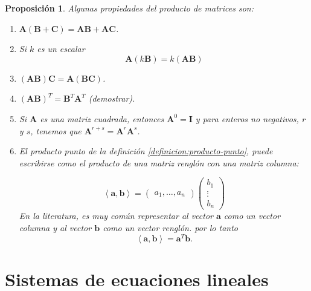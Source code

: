 \documentclass[11pt]{report}
\theoremstyle{break}
\newtheorem{proposicion}{Proposición}[chapter]
\theoremstyle{break}
\begin{document}
\begin{proposicion}
\label{proposicion:producto-matrices}
Algunas propiedades del producto de matrices son:
\begin{enumerate}[label=\alph*)]
\item $\bm{A} (\bm{B} + \bm{C}) = \bm{A}\bm{B} + \bm{A}\bm{C}$.
\item Si $k$ es un escalar 
$$\bm{A}(k\bm{B}) = k(\bm{AB})$$
\item $(\bm{AB})\bm{C} = \bm{A}(\bm{BC})$.
\item $(\bm{AB})^{T} = \bm{B}^{T} \bm{A}^{T}$ (demostrar).
\item Si $\bm{A}$ es una matriz cuadrada, entonces $\bm{A}^{0} = \bm{I}$ y para enteros no negativos, $r$ y $s$, tenemos que $\bm{A}^{r+s} = \bm{A}^{r} \bm{A}^{s}$.
\item El producto punto de la definición \ref{definicion:producto-punto}, puede escribirse como el producto de una matriz renglón con una matriz columna:

$$
\left< \bm{a}, \bm{b} \right>=
\begin{pmatrix}
a_1, \ldots , a_n
\end{pmatrix}
\begin{pmatrix}
b_1 \\
\vdots \\
b_n
\end{pmatrix}
$$
En la literatura, es muy común representar al vector $\bm{a}$ como un vector columna y al vector $\bm{b}$ como un vector renglón. por lo tanto
$$
\left< \bm{a}, \bm{b} \right> = \bm{a}^{T} \bm{b}.
$$
\end{enumerate}
\end{proposicion}

\section{Sistemas de ecuaciones lineales}
\label{section:sistemas-ecuaciones-lineales}
\end{document}
